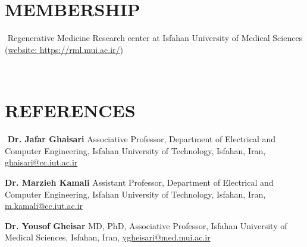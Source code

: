 ‎\documentclass[margin‎, ‎10pt]{res} %
\begin{document}
\begin{resume}
             
‎\section{MEMBERSHIP}‎ 
‎Regenerative Medicine Research center at Isfahan University of Medical Sciences‎
‎\href{https://rml.mui.ac.ir/}{(website‎: ‎https://rml.mui.ac.ir/)}‎

‎\section{REFERENCES}‎
‎\textbf{Dr‎. ‎Jafar Ghaisari‎ }
‎Associative Professor‎, ‎Department of Electrical and Computer Engineering‎, ‎Isfahan University of Technology‎, ‎Isfahan‎, ‎Iran‎, ‎\underline{ghaisari@cc.iut.ac.ir}‎ 

‎\textbf{Dr‎. ‎Marzieh Kamali‎ } 
‎Assistant Professor‎, ‎Department of Electrical and Computer Engineering‎, ‎Isfahan University of Technology‎, ‎Isfahan‎, ‎Iran‎, ‎\underline{m.kamali@cc.iut.ac.ir}‎ 

‎\textbf{Dr‎. ‎Yousof Gheisar‎ }
‎MD‎, ‎PhD‎, ‎Associative Professor‎, ‎Isfahan University of Medical Sciences‎, ‎Isfahan‎, ‎Iran‎, ‎\underline{ygheisari@med.mui.ac.ir}‎
‎\end{resume}‎
‎
\end{document}
